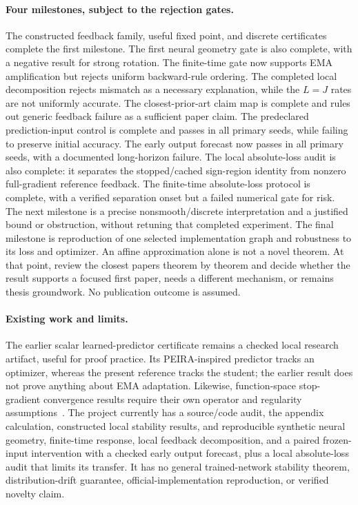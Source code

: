 \documentclass[11pt,a4paper]{article}
\begin{document}
\paragraph{Four milestones, subject to the rejection gates.}
The constructed feedback family, useful fixed point, and discrete
certificates complete the first milestone. The first neural geometry gate
is also complete, with a negative result for strong rotation. The finite-time
gate now supports EMA amplification but rejects uniform backward-rule
ordering. The completed local decomposition rejects mismatch as a
necessary explanation, while the $L=J$ rates are not uniformly
accurate. The closest-prior-art claim map is complete and rules out
generic feedback failure as a sufficient paper claim. The predeclared
prediction-input control is complete and passes in all primary seeds,
while failing to preserve initial accuracy. The early output forecast
now passes in all primary seeds, with a documented long-horizon failure.
The local absolute-loss audit is also complete: it separates the
stopped/cached sign-region identity from nonzero full-gradient reference
feedback. The finite-time absolute-loss protocol is complete, with a
verified separation onset but a failed numerical gate for risk. The next
milestone is a precise nonsmooth/discrete interpretation and a justified
bound or obstruction, without retuning that completed experiment.
The final milestone is reproduction of one selected implementation graph
and robustness to its loss and optimizer. An affine approximation alone is not a novel theorem.
At that point, review the closest
papers theorem by theorem and decide whether the result supports a focused
first paper, needs a different mechanism, or remains thesis groundwork.
No publication outcome is assumed.

\paragraph{Existing work and limits.}
The earlier scalar learned-predictor certificate remains a checked local
research artifact, useful for proof practice. Its PEIRA-inspired predictor
tracks an optimizer, whereas the present reference tracks the student;
the earlier result does not prove anything about EMA adaptation. Likewise,
function-space stop-gradient convergence results require their own operator
and regularity assumptions~\cite{stopgrads}. The project currently has a source/code audit, the appendix calculation,
constructed local stability results, and reproducible synthetic neural
geometry, finite-time response, local feedback decomposition, and a
paired frozen-input intervention with a checked early output forecast,
plus a local absolute-loss audit that limits its transfer.
It has no general trained-network stability theorem,
distribution-drift guarantee, official-implementation reproduction,
or verified novelty claim.
\end{document}
